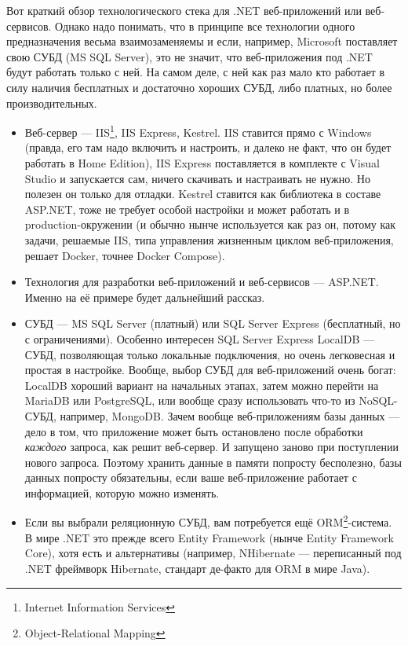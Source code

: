 \documentclass{../../text-style}
\begin{document}
Вот краткий обзор технологического стека для .NET веб-приложений или веб-сервисов. Однако надо понимать, что в принципе все технологии одного предназначения весьма взаимозаменяемы и если, например, Microsoft поставляет свою СУБД (MS SQL Server), это не значит, что веб-приложения под .NET будут работать только с ней. На самом деле, с ней как раз мало кто работает в силу наличия бесплатных и достаточно хороших СУБД, либо платных, но более производительных.

\begin{itemize}
    \item Веб-сервер --- IIS\footnote{Internet Information Services}, IIS Express, Kestrel. IIS ставится прямо с Windows (правда, его там надо включить и настроить, и далеко не факт, что он будет работать в Home Edition), IIS Express поставляется в комплекте с Visual Studio и запускается сам, ничего скачивать и настраивать не нужно. Но полезен он только для отладки. Kestrel ставится как библиотека в составе ASP.NET, тоже не требует особой настройки и может работать и в production-окружении (и обычно нынче используется как раз он, потому как задачи, решаемые IIS, типа управления жизненным циклом веб-приложения, решает Docker, точнее Docker Compose).
    \item Технология для разработки веб-приложений и веб-сервисов --- ASP.NET. Именно на её примере будет дальнейший рассказ.
    \item СУБД --- MS SQL Server (платный) или SQL Server Express (бесплатный, но с ограничениями). Особенно интересен SQL Server Express LocalDB --- СУБД, позволяющая только локальные подключения, но очень легковесная и простая в настройке. Вообще, выбор СУБД для веб-приложений очень богат: LocalDB хороший вариант на начальных этапах, затем можно перейти на MariaDB или PostgreSQL, или вообще сразу использовать что-то из NoSQL-СУБД, например, MongoDB. Зачем вообще веб-приложениям базы данных --- дело в том, что приложение может быть остановлено после обработки \emph{каждого} запроса, как решит веб-сервер. И запущено заново при поступлении нового запроса. Поэтому хранить данные в памяти попросту бесполезно, базы данных попросту обязательны, если ваше веб-приложение работает с информацией, которую можно изменять.
    \item Если вы выбрали реляционную СУБД, вам потребуется ещё ORM\footnote{Object-Relational Mapping}-система. В мире .NET это прежде всего Entity Framework (нынче Entity Framework Core), хотя есть и альтернативы (например, NHibernate --- переписанный под .NET фреймворк Hibernate, стандарт де-факто для ORM в мире Java).

\end{itemize}
\end{document}
